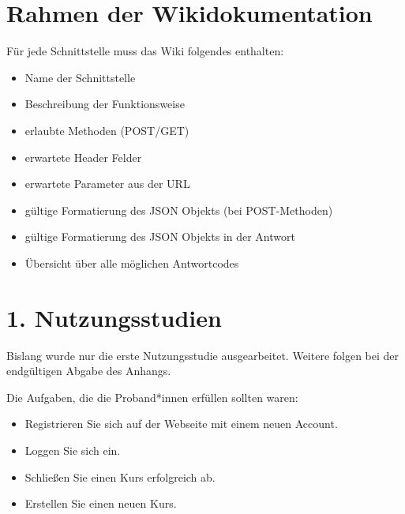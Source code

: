 \documentclass[accentcolor=tud0b,12pt,paper=a4]{tudreport}
\begin{document}
\section{Rahmen der Wikidokumentation}
Für jede Schnittstelle muss das Wiki folgendes enthalten:
\begin{multicols}{2}
\begin{itemize}
	\item Name der Schnittstelle
	\item Beschreibung der Funktionsweise
	\item erlaubte Methoden (POST/GET)
	\item erwartete Header Felder
	\item erwartete Parameter aus der URL
	\item gültige Formatierung des JSON Objekts (bei POST-Methoden)
	\item gültige Formatierung des JSON Objekts in der Antwort
	\item Übersicht über alle möglichen Antwortcodes 
\end{itemize}
\end{multicols}
\pagebreak
\section{1. Nutzungsstudien}
Bislang wurde nur die erste Nutzungsstudie ausgearbeitet. Weitere folgen bei der endgültigen Abgabe des Anhangs.

Die Aufgaben, die die Proband*innen erfüllen sollten waren:
\begin{itemize}
	\item Registrieren Sie sich auf der Webseite mit einem neuen Account.
	\item Loggen Sie sich ein.
	\item Schließen Sie einen Kurs erfolgreich ab.
	\item Erstellen Sie einen neuen Kurs.
\end{itemize}
	
\end{document}
